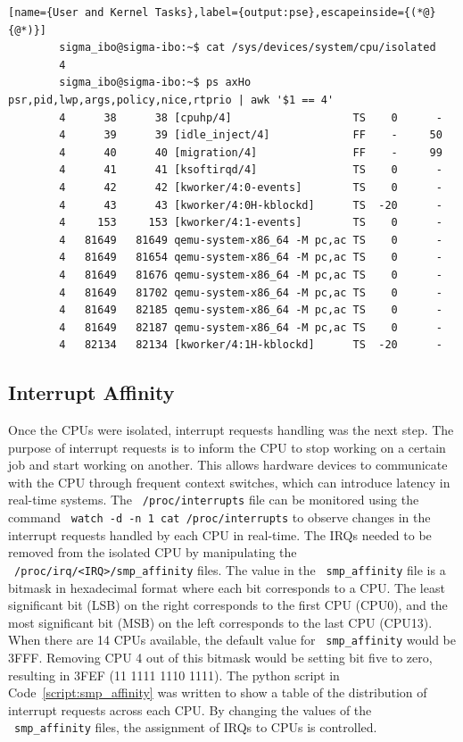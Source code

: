 \documentclass[MMR,Master,english]{twbook}
\begin{document}
\vspace{1em}
\begin{minipage}{0.95\columnwidth}
	\begin{lstlisting}[name={User and Kernel Tasks},label={output:pse},escapeinside={(*@}{@*)}]
		sigma_ibo@sigma-ibo:~$ cat /sys/devices/system/cpu/isolated
		4
		sigma_ibo@sigma-ibo:~$ ps axHo psr,pid,lwp,args,policy,nice,rtprio | awk '$1 == 4'
		4      38      38 [cpuhp/4]                   TS    0      -
		4      39      39 [idle_inject/4]             FF    -     50
		4      40      40 [migration/4]               FF    -     99
		4      41      41 [ksoftirqd/4]               TS    0      -
		4      42      42 [kworker/4:0-events]        TS    0      -
		4      43      43 [kworker/4:0H-kblockd]      TS  -20      -
		4     153     153 [kworker/4:1-events]        TS    0      -
		4   81649   81649 qemu-system-x86_64 -M pc,ac TS    0      -
		4   81649   81654 qemu-system-x86_64 -M pc,ac TS    0      -
		4   81649   81676 qemu-system-x86_64 -M pc,ac TS    0      -
		4   81649   81702 qemu-system-x86_64 -M pc,ac TS    0      -
		4   81649   82185 qemu-system-x86_64 -M pc,ac TS    0      -
		4   81649   82187 qemu-system-x86_64 -M pc,ac TS    0      -
		4   82134   82134 [kworker/4:1H-kblockd]      TS  -20      -
\end{lstlisting}
\end{minipage}
\subsection{Interrupt Affinity}\label{subsec:irq_handling}
Once the CPUs were isolated, interrupt requests handling was the next step. The purpose of interrupt requests is to inform the CPU to stop working on a certain job and start working on another. This allows hardware devices to communicate with the CPU through frequent context switches, which can introduce latency in real-time systems. The ~\texttt{/proc/interrupts} file can be monitored using the command ~\texttt{watch -d -n 1 cat /proc/interrupts} to observe changes in the interrupt requests handled by each CPU in real-time. The IRQs needed to be removed from the isolated CPU by manipulating the ~\texttt{/proc/irq/<IRQ>/smp\_affinity} files. The value in the ~\texttt{smp\_affinity} file is a bitmask in hexadecimal format where each bit corresponds to a CPU. The least significant bit (LSB) on the right corresponds to the first CPU (CPU0), and the most significant bit (MSB) on the left corresponds to the last CPU (CPU13). When there are 14 CPUs available, the default value for ~\texttt{smp\_affinity} would be 3FFF. Removing CPU 4 out of this bitmask would be setting bit five to zero, resulting in 3FEF (11 1111 1110 1111). The python script in Code~\ref{script:smp_affinity} was written to show a table of the distribution of interrupt requests across each CPU. By changing the values of the ~\texttt{smp\_affinity} files, the assignment of IRQs to CPUs is controlled. 
\end{document}
